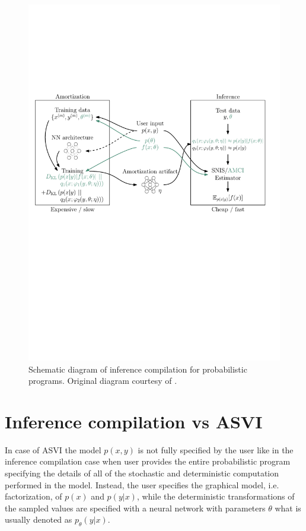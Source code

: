 \documentclass[12pt]{article}
\begin{document}
\begin{figure}[t]
  \centering
  \includegraphics[width=0.8\linewidth]{figures/diagram.pdf}
  \caption{
  Schematic diagram of inference compilation for probabilistic programs. 
  Original diagram courtesy of \citet{LeEtAl2016}.}
  \label{fig:inf-amortization}
\end{figure}




\section{Inference compilation vs ASVI}

In case of ASVI the model $p(x,y)$ is not fully specified by the user like in the inference compilation case
when user provides the entire probabilistic program specifying the details of all of the stochastic and deterministic
computation performed in the model.
Instead, the user specifies the graphical model, i.e. factorization, of $p(x)$ and $p(y|x)$, 
while the deterministic transformations of the sampled values are specified with a neural network with parameters $\theta$
what is usually denoted as $p_\theta(y|x)$.
\end{document}

